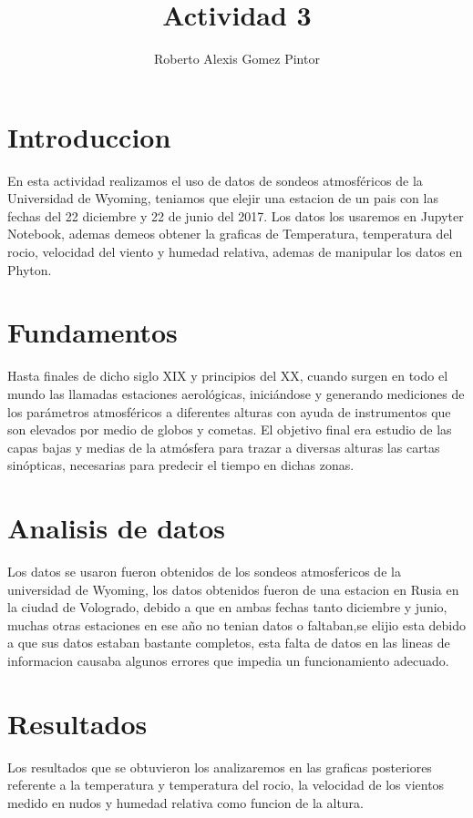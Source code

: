\documentclass{article}
\title{Actividad 3}
\author{Roberto Alexis Gomez Pintor}
\begin{document}
\maketitle
\section{Introduccion}
En esta actividad realizamos el uso de datos de sondeos atmosféricos de la Universidad de Wyoming, teniamos que elejir una estacion de un pais con las fechas del 22 diciembre y 22 de junio del 2017. Los datos los usaremos en Jupyter Notebook, ademas demeos obtener la graficas de Temperatura, temperatura del rocio, velocidad del viento y humedad relativa, ademas de manipular los datos en Phyton.

\section{Fundamentos}
Hasta finales de dicho siglo XIX y principios del XX, cuando surgen en todo el mundo las llamadas estaciones aerológicas, iniciándose y generando mediciones de los parámetros atmosféricos a diferentes alturas con ayuda de instrumentos que son elevados por medio de globos y cometas. El objetivo final era estudio de las capas bajas y medias de la atmósfera para trazar a diversas alturas las cartas sinópticas, necesarias para predecir el tiempo en dichas zonas.

\section{Analisis de datos}
Los datos se usaron fueron obtenidos de los sondeos atmosfericos de la universidad de Wyoming, los datos obtenidos fueron de una estacion en Rusia en la ciudad de Vologrado, debido a que en ambas fechas tanto diciembre y junio, muchas otras estaciones en ese año no tenian datos o faltaban,se elijio esta debido a que sus datos estaban bastante completos, esta falta de datos en las lineas de informacion causaba algunos errores que impedia un funcionamiento adecuado.

\section{Resultados}
Los resultados que se obtuvieron los analizaremos en las graficas posteriores referente a la temperatura y temperatura del rocio, la velocidad de los vientos medido en nudos y humedad relativa como funcion de la altura.
\end{document}

